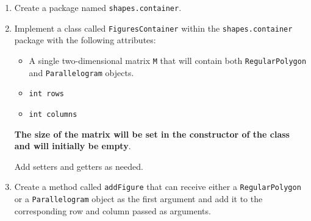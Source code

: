\begin{enumerate}
\begin{itemize}
            \item \texttt{double angle1, angle2}

        \end{itemize}

    Define two constructors:

        \begin{itemize}

            \item \texttt{Parallelogram(String fillColor, String borderColor, double side1, double side2, double angle1, double angle2)}

            \item \texttt{Parallelogram(double side, double angle, String fillColor, String borderColor)}

        \end{itemize}

    \textbf{Always ensure that constructors call the parent class constructor, otherwise they will try to call the default one}.

    Add any setters and getters you deem necessary. In this class, make public what you consider appropriate, except for the attributes.

    \item Create a package named \texttt{shapes.container}.

    \item Implement a class called \texttt{FiguresContainer} within the \texttt{shapes.container} package with the following attributes:

        \begin{itemize}

            \item A single two-dimensional matrix \texttt{M} that will contain both \texttt{RegularPolygon} and \texttt{Parallelogram} objects.

            \item \texttt{int rows}

            \item \texttt{int columns}

        \end{itemize}

    \textbf{The size of the matrix will be set in the constructor of the class and will initially be empty}.

    Add setters and getters as needed.

    \item Create a method called \texttt{addFigure} that can receive either a \texttt{RegularPolygon} or a \texttt{Parallelogram} object as the first argument and add it to the corresponding row and column passed as arguments.


\end{enumerate}
